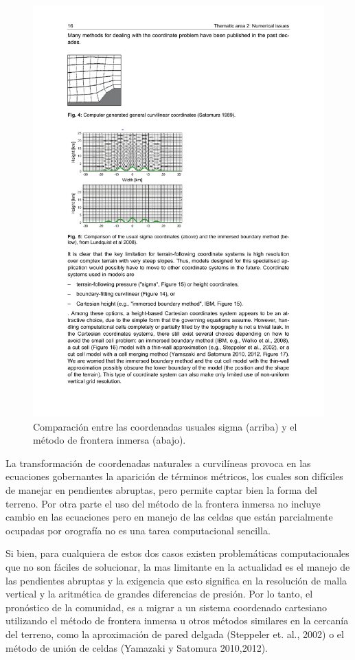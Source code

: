  
\begin{figure}[h!]
	\centering
	\includegraphics[width=0.8\linewidth,trim={2.6cm 13.5cm 9.2cm 9cm},clip]{Imagenes/02/coordinates}
	\caption{Comparación entre las coordenadas usuales sigma (arriba) y el método de frontera inmersa (abajo).}
	\label{fig:02_coordinates}
\end{figure}
La transformación de coordenadas naturales a curvilíneas provoca en las ecuaciones gobernantes la aparición de términos métricos, los cuales son difíciles de manejar en pendientes abruptas, pero permite captar bien la forma del terreno. Por otra parte el uso del método de la frontera inmersa no incluye cambio en las ecuaciones pero en manejo de las celdas que están parcialmente ocupadas por orografía no es una tarea computacional sencilla.

Si bien, para cualquiera de estos dos casos existen problemáticas computacionales que no son fáciles de solucionar, la mas limitante en la actualidad es el manejo de las pendientes abruptas y la exigencia que esto significa en la resolución de malla vertical y la aritmética de grandes diferencias de presión. Por lo tanto, el pronóstico de la comunidad, es a migrar a un sistema coordenado cartesiano utilizando el método de frontera inmersa u otros métodos similares en la cercanía del terreno, como la aproximación de pared delgada (Steppeler et. al., 2002) o el método de unión de celdas (Yamazaki y Satomura 2010,2012).

